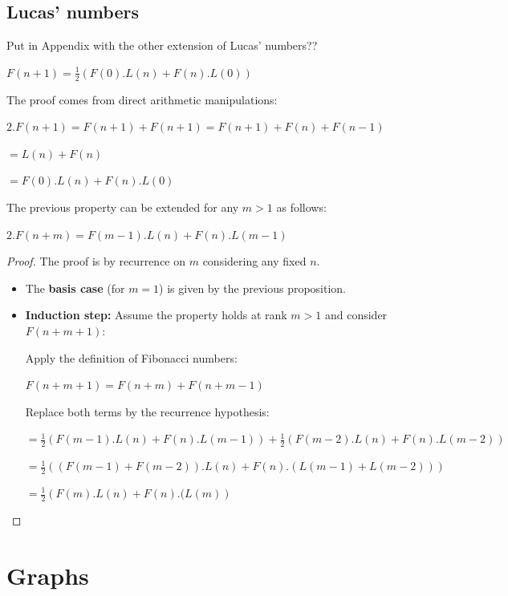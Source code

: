 \subsection{Lucas' numbers}

{\Denis Put in Appendix with the other extension of Lucas' numbers??}

\begin{prop} 
$F(n+1) = \frac{1}{2} (F(0).L(n) + F(n).L(0))$
\end{prop}
\medskip

\noindent
The proof comes from direct arithmetic manipulations:

$2.F(n+1) = F(n+1) +  F(n+1) =  F(n+1) + F(n) + F(n-1)$

$= L(n) + F(n) $

$= F(0).L(n) + F(n).L(0)$
\medskip


The previous property can be extended for any $m>1$ as follows:
\medskip

\begin{prop} 
$2.F(n+m) = F(m-1).L(n) + F(n).L(m-1)$
\end{prop}

\begin{proof}
The proof is by recurrence on $m$ considering any fixed $n$.
\begin{itemize}
\item
The \textbf{basis case} (for $m=1$) is given by the previous proposition.

\item
\textbf{Induction step:} 
Assume the property holds at rank $m > 1$ and consider $F(n+m+1)$:

Apply the definition of Fibonacci numbers: 

$F(n+m+1) = F(n+m)+F(n+m-1)$ 

Replace both terms by the recurrence hypothesis:

$= \frac{1}{2} (F(m-1).L(n) + F(n).L(m-1)) + \frac{1}{2} (F(m-2).L(n) + F(n).L(m-2))$

$= \frac{1}{2} \left( (F(m-1)+F(m-2)).L(n) + F(n).(L(m-1)+L(m-2))\right)$

$= \frac{1}{2} \left(F(m).L(n) + F(n).(L(m)\right)$
\end{itemize}

\end{proof}



\section{Graphs}


